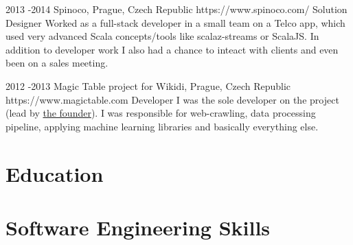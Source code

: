 \documentclass[10pt]{article} %
\begin{document}

\job
{2013 -}{2014 }
{Spinoco, Prague, Czech Republic}
{https://www.spinoco.com/}
{Solution Designer}
{Worked as a full-stack developer in a small team on a Telco app, which used very advanced Scala concepts/tools like scalaz-streams or ScalaJS. In addition to developer work I also had a chance to inteact with clients and even been on a sales meeting.\\
}


\job
{2012 -}{2013}
{Magic Table project for Wikidi, Prague, Czech Republic}
{https://www.magictable.com}
{Developer}
{I was the sole developer on the project (lead by \href{https://michal.illich.cz/}{the founder}). I was responsible for web-crawling, data processing pipeline, applying machine learning libraries and basically everything else. \\
}



\section{Education}






\section{Software Engineering Skills}
\end{document}
